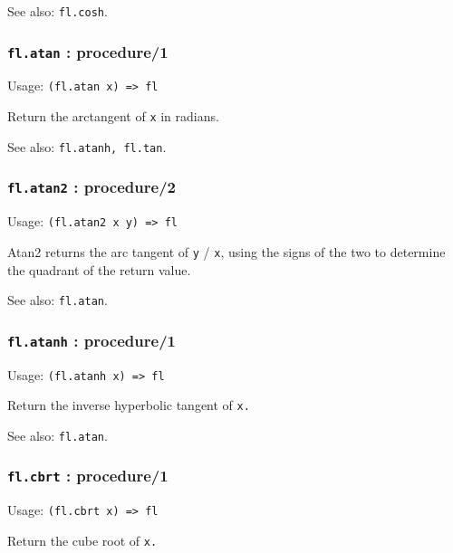 \documentclass[
]{article}
\newcommand{\passthrough}[1]{#1}
\begin{document}
See also: \passthrough{\lstinline!fl.cosh!}.

\hypertarget{fl.atan-procedure1}{%
\subsubsection{\texorpdfstring{\texttt{fl.atan} :
procedure/1}{fl.atan : procedure/1}}\label{fl.atan-procedure1}}

Usage: \passthrough{\lstinline!(fl.atan x) => fl!}

Return the arctangent of \passthrough{\lstinline!x!} in radians.

See also: \passthrough{\lstinline!fl.atanh, fl.tan!}.

\hypertarget{fl.atan2-procedure2}{%
\subsubsection{\texorpdfstring{\texttt{fl.atan2} :
procedure/2}{fl.atan2 : procedure/2}}\label{fl.atan2-procedure2}}

Usage: \passthrough{\lstinline!(fl.atan2 x y) => fl!}

Atan2 returns the arc tangent of \passthrough{\lstinline!y!} /
\passthrough{\lstinline!x!}, using the signs of the two to determine the
quadrant of the return value.

See also: \passthrough{\lstinline!fl.atan!}.

\hypertarget{fl.atanh-procedure1}{%
\subsubsection{\texorpdfstring{\texttt{fl.atanh} :
procedure/1}{fl.atanh : procedure/1}}\label{fl.atanh-procedure1}}

Usage: \passthrough{\lstinline!(fl.atanh x) => fl!}

Return the inverse hyperbolic tangent of \passthrough{\lstinline!x.!}

See also: \passthrough{\lstinline!fl.atan!}.

\hypertarget{fl.cbrt-procedure1}{%
\subsubsection{\texorpdfstring{\texttt{fl.cbrt} :
procedure/1}{fl.cbrt : procedure/1}}\label{fl.cbrt-procedure1}}

Usage: \passthrough{\lstinline!(fl.cbrt x) => fl!}

Return the cube root of \passthrough{\lstinline!x.!}
\end{document}
